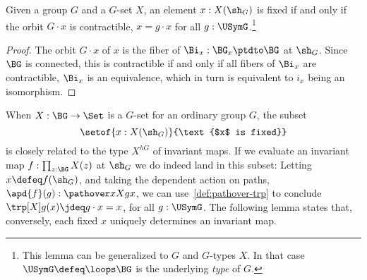 \begin{lemma}\label{lem:fixed-char}
  Given a group $G$ and a $G$-set $X$, an element $x:X(\sh_G)$ is
 fixed if and only if the orbit $G\cdot x$ is contractible,
  \ie $x = g\cdot x$ for all $g:\USymG$.\footnote{%
  This lemma can be generalized to \inftygps $G$ and $G$-types $X$.
  In that case $\USymG\defeq\loops\BG$ is the underlying \emph{type} of $G$.}
\end{lemma}
\begin{proof}
  The orbit $G\cdot x$ of $x$ is the fiber of $\Bi_x : \BG_x \ptdto \BG$
  at $\sh_G$. Since $\BG$ is connected,
  this is contractible if and only if all fibers of $\Bi_x$ are contractible,
  \ie $\Bi_x$ is an equivalence, which in turn is equivalent to $i_x$
  being an isomorphism.
\end{proof}

When $X : \BG \to \Set$ is a $G$-set for an ordinary group $G$, the subset
\[
  \setof{x : X(\sh_G)}{\text{$x$ is fixed}}
\]
is closely related to the type $X^{hG}$ of invariant maps.
If we evaluate an invariant map $f : \prod_{z:\BG}X(z)$ at $\sh_G$
we do indeed land in this subset:
Letting $x\defeq f(\sh_G)$,
and taking the dependent action on paths,
$\apd{f}(g) : \pathover x X g x$,
we can use~\cref{def:pathover-trp} to conclude
$\trp[X] g(x)\jdeq g\cdot x = x$, for all $g:\USymG$.
The following lemma states that, conversely, each fixed $x$ uniquely
determines an invariant map.

